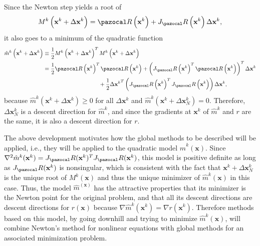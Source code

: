 Since the Newton step yields a root of
\begin{equation}
  M^k\left(\mathbf x^k+\Delta \mathbf x^k\right)=\pazocal R\left(\mathbf x^k\right)+J_\pazocal R\left(\mathbf x^k\right) \Delta \mathbf x^k,
\end{equation}
it also goes to a minimum of the quadratic function
\begin{equation}
  \begin{aligned}
    \hat{m}^k\left(\mathbf x^k+\Delta \mathbf x^k\right) & \equiv \frac{1}{2} M^k\left(\mathbf x^k+ \Delta \mathbf x^k\right)^{T} M^k\left(\mathbf x^k+\Delta \mathbf x^k\right) \\
    &= \frac{1}{2} \pazocal R\left(\mathbf x^k\right)^{T} \pazocal R\left(\mathbf x^k\right)+\left(J_\pazocal R\left(\mathbf x^k\right)^{T} \pazocal R\left(\mathbf x^k\right)\right)^{T} \Delta \mathbf x^k\\
    & \qquad\qquad\qquad\qquad\qquad+\frac{1}{2} \Delta {\mathbf x^k}^{T}\left(J_\pazocal R\left(\mathbf x^k\right)^{T} J_\pazocal R\left(\mathbf x^k\right)\right) \Delta \mathbf x^k,
  \end{aligned}
\end{equation}
because \(\hat{m}^k\left(\mathbf x^k+\Delta \mathbf x^k\right) \geq 0\) for all \(\Delta \mathbf x^k\) and \(\hat{m}^k\left(\mathbf x^k+\Delta \mathbf x^k_N\right)=0\).
Therefore, \(\Delta \mathbf x^k_N\) is a descent direction for \(\hat{m}^k\), and since the gradients at \(\mathbf x^k\) of \(\hat{m}^k\) and \(r\) are the same, it is also a descent direction for \(r\).

The above development motivates how the global methods to be described will be applied, i.e., they will be applied to the quadratic model \(\hat{m}^k(\mathbf x)\).
Since \(\nabla^{2} \hat{m}^k(\mathbf x^k)=J_\pazocal R(\mathbf x^k)^{T} J_\pazocal R(\mathbf x^k)\), this model is positive definite as long as \(J_\pazocal R(\mathbf x^k)\) is nonsingular, which is consistent with the fact that \(\mathbf x^k + \Delta \mathbf x^k_N\) is the unique root of \(M^k(\mathbf x)\) and thus the unique minimizer of \(\hat{m}^k(\mathbf x)\) in this case.
Thus, the model \(\hat{m}^(\mathbf x)\) has the attractive properties that its minimizer is the Newton point for the original problem, and that all its descent directions are descent directions for \(r(\mathbf x)\) because \(\nabla \hat{m}^k(\mathbf x^k)=\nabla r(\mathbf x^k)\).
Therefore methods based on this model, by going downhill and trying to minimize \(\hat{m}^k(\mathbf x)\), will combine Newton's method for nonlinear equations with global methods for an associated minimization problem.

